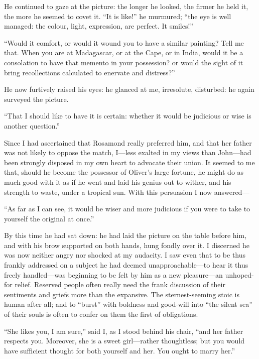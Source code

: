 He continued to gaze at the picture: the longer he looked, the firmer he
held it, the more he seemed to covet it. \enquote{It is like!} he
murmured; \enquote{the eye is well managed: the colour, light,
	expression, are perfect. It smiles!}

\enquote{Would it comfort, or would it wound you to have a similar
	painting? Tell me that. When you are at Madagascar, or at the Cape, or
	in India, would it be a consolation to have that memento in your
	possession? or would the sight of it bring recollections calculated to
	enervate and distress?}

He now furtively raised his eyes: he glanced at me, irresolute,
disturbed: he again surveyed the picture.

\enquote{That I should like to have it is certain: whether it would be
	judicious or wise is another question.}

Since I had ascertained that Rosamond really preferred him, and that her
father was not likely to oppose the match, I---less exalted in my views
than \St{} John---had been strongly disposed in my own heart to advocate
their union. It seemed to me that, should he become the possessor of
\Mr{} Oliver's large fortune, he might do as much good with it as if he
went and laid his genius out to wither, and his strength to waste, under
a tropical sun. With this persuasion I now answered---

\enquote{As far as I can see, it would be wiser and more judicious if
	you were to take to yourself the original at once.}

By this time he had sat down: he had laid the picture on the table
before him, and with his brow supported on both hands, hung fondly over
it. I discerned he was now neither angry nor shocked at my audacity. I
saw even that to be thus frankly addressed on a subject he had deemed
unapproachable---to hear it thus freely handled---was beginning to be
felt by him as a new pleasure---an unhoped-for relief. Reserved people
often really need the frank discussion of their sentiments and griefs
more than the expansive. The sternest-seeming stoic is human after all;
and to \enquote{burst} with boldness and good-will into \enquote{the
	silent sea} of their souls is often to confer on them the first of
obligations.

\enquote{She likes you, I am sure,} said I, as I stood behind his chair,
\enquote{and her father respects you. Moreover, she is a sweet
	girl---rather thoughtless; but you would have sufficient thought for
	both yourself and her. You ought to marry her.}

